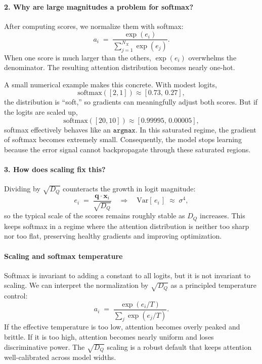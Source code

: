 \paragraph{2. Why are large magnitudes a problem for softmax?}

\noindent
After computing scores, we normalize them with softmax:
\begin{equation}
	a_i \;=\; 
	\frac{\exp(e_i)}{\sum_{j=1}^{N_X} \exp(e_j)}.
\end{equation}
When one score is much larger than the others, \(\exp(e_i)\) overwhelms the denominator.
The resulting attention distribution becomes nearly one-hot.

\noindent
A small numerical example makes this concrete.
With modest logits,
\[
\text{softmax}([2,1])
\approx
[0.73,\,0.27],
\]
the distribution is ``soft,'' so gradients can meaningfully adjust both scores.
But if the logits are scaled up,
\[
\text{softmax}([20,10])
\approx
[0.99995,\,0.00005],
\]
softmax effectively behaves like an \(\texttt{argmax}\).
In this saturated regime, the gradient of softmax becomes extremely small.
Consequently, the model stops learning because the error signal cannot backpropagate through these saturated regions.

\paragraph{3. How does scaling fix this?}

\noindent
Dividing by \(\sqrt{D_Q}\) counteracts the growth in logit magnitude:
\begin{equation}
	e_i 
	\;=\;
	\frac{\mathbf{q}\cdot\mathbf{x}_i}{\sqrt{D_Q}}
	\quad\Longrightarrow\quad
	\text{Var}[\,e_i\,]
	\;\approx\;
	\sigma^4,
\end{equation}
so the typical scale of the scores remains roughly stable as \(D_Q\) increases.
This keeps softmax in a regime where the attention distribution is neither too sharp nor too flat, preserving healthy gradients and improving optimization.

\paragraph{Scaling and softmax temperature}

\noindent
Softmax is invariant to adding a constant to all logits, but it is not invariant to scaling.
We can interpret the normalization by \(\sqrt{D_Q}\) as a principled temperature control:
\begin{equation}
	a_i \;=\; \frac{\exp(e_i / T)}{\sum_{j} \exp(e_j / T)}.
\end{equation}
If the effective temperature is too low, attention becomes overly peaked and brittle.
If it is too high, attention becomes nearly uniform and loses discriminative power.
The \(\sqrt{D_Q}\) scaling is a robust default that keeps attention well-calibrated across model widths.


